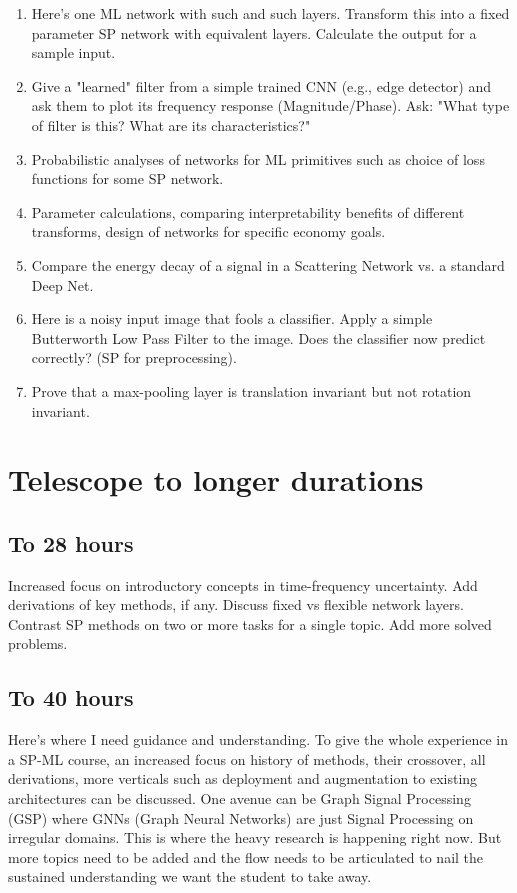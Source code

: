\documentclass[12pt]{article}
\begin{document}
\begin{enumerate}
    \item Here's one ML network with such and such layers. Transform this into a fixed parameter SP network with equivalent layers. Calculate the output for a sample input.
    \item Give a "learned" filter from a simple trained CNN (e.g., edge detector) and ask them to plot its frequency response (Magnitude/Phase). Ask: "What type of filter is this? What are its characteristics?"
    \item Probabilistic analyses of networks for ML primitives such as choice of loss functions for some SP network.
    \item Parameter calculations, comparing interpretability benefits of different transforms, design of networks for specific economy goals.
    \item Compare the energy decay of a signal in a Scattering Network vs. a standard Deep Net.
    \item Here is a noisy input image that fools a classifier. Apply a simple Butterworth Low Pass Filter to the image. Does the classifier now predict correctly? (SP for preprocessing).
    \item Prove that a max-pooling layer is translation invariant but not rotation invariant.
\end{enumerate}

\section{Telescope to longer durations}
\subsection{To 28 hours}
Increased focus on introductory concepts in time-frequency uncertainty. Add derivations of key methods, if any. Discuss fixed vs flexible network layers. Contrast SP methods on two or more tasks for a single topic. Add more solved problems.
\subsection{To 40 hours}
Here's where I need guidance and understanding. To give the whole experience in a SP-ML course, an increased focus on history of methods, their crossover, all derivations, more verticals such as deployment and augmentation to existing architectures can be discussed. One avenue can be Graph Signal Processing (GSP) where GNNs (Graph Neural Networks) are just Signal Processing on irregular domains. This is where the heavy research is happening right now. But more topics need to be added and the flow needs to be articulated to nail the sustained understanding we want the student to take away. 
\end{document}
